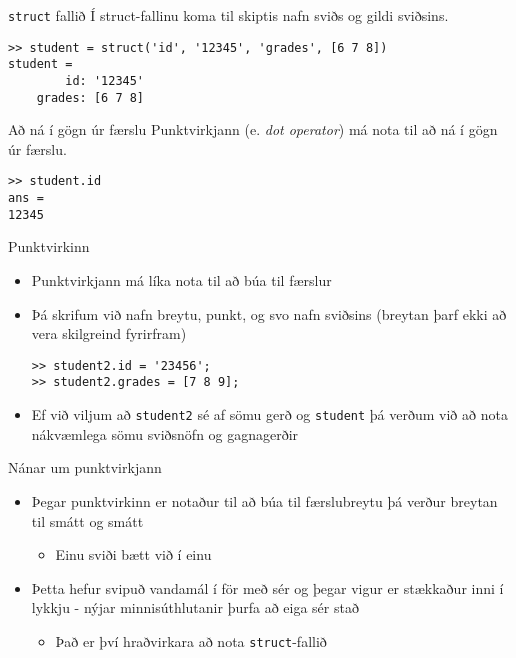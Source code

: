 \documentclass[handout]{beamer}
\begin{document}
\begin{frame}[fragile]{\texttt{struct} fallið}
Í struct-fallinu koma til skiptis nafn sviðs og gildi sviðsins.
\begin{verbatim}
>> student = struct('id', '12345', 'grades', [6 7 8])
student = 
        id: '12345'
    grades: [6 7 8]
\end{verbatim}
\end{frame}

\begin{frame}[fragile]{Að ná í gögn úr færslu}
Punktvirkjann (e. \emph{dot operator}) má nota til að ná í gögn úr færslu.
\begin{verbatim}
>> student.id
ans =
12345
\end{verbatim}
\end{frame}

\begin{frame}[fragile]{Punktvirkinn}
\begin{itemize}
 \item Punktvirkjann má líka nota til að búa til færslur
 \item Þá skrifum við nafn breytu, punkt, og svo nafn sviðsins (breytan þarf ekki að vera skilgreind fyrirfram)
\begin{verbatim}
>> student2.id = '23456';
>> student2.grades = [7 8 9];
\end{verbatim}
 \item Ef við viljum að \texttt{student2} sé af sömu gerð og \texttt{student} þá verðum við að nota nákvæmlega sömu sviðsnöfn og gagnagerðir
\end{itemize}
\end{frame}

\begin{frame}{Nánar um punktvirkjann}
\begin{itemize}
 \item Þegar punktvirkinn er notaður til að búa til færslubreytu þá verður breytan til smátt og smátt
 \begin{itemize}
  \item Einu sviði bætt við í einu
 \end{itemize}
 \item Þetta hefur svipuð vandamál í för með sér og þegar vigur er stækkaður inni í lykkju - nýjar minnisúthlutanir þurfa að eiga sér stað
 \begin{itemize}
  \item Það er því hraðvirkara að nota \texttt{struct}-fallið
 \end{itemize}
\end{itemize}
\end{frame}
\end{document}
